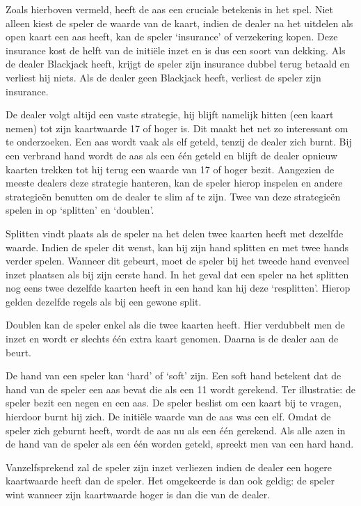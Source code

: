 \documentclass[11pt, final, journal, a4paper]{IEEEtran}
\begin{document}
Zoals hierboven vermeld, heeft de aas een cruciale betekenis in het spel. Niet alleen kiest de speler de waarde van de kaart, indien de dealer na het uitdelen als open kaart een aas heeft, kan de speler `insurance' of verzekering kopen. Deze insurance kost de helft van de initiële inzet en is dus een soort van dekking. Als de dealer Blackjack heeft, krijgt de speler zijn insurance dubbel terug betaald en verliest hij niets. Als de dealer geen Blackjack heeft, verliest de speler zijn insurance.

De dealer volgt altijd een vaste strategie, hij blijft namelijk hitten (een kaart nemen) tot zijn kaartwaarde 17 of hoger is. Dit maakt het net zo interessant om te onderzoeken. Een aas wordt vaak als elf geteld, tenzij de dealer zich burnt. Bij een verbrand hand wordt de aas als een één geteld en blijft de dealer opnieuw kaarten trekken tot hij terug een waarde van 17 of hoger bezit. Aangezien de meeste dealers deze strategie hanteren, kan de speler hierop inspelen en andere strategieën benutten om de dealer te slim af te zijn. Twee van deze strategieën spelen in op `splitten' en `doublen'. 

Splitten vindt plaats als de speler na het delen twee kaarten heeft met dezelfde waarde. Indien de speler dit wenst, kan hij zijn hand splitten en met twee hands verder spelen. Wanneer dit gebeurt, moet de speler bij het tweede hand evenveel inzet plaatsen als bij zijn eerste hand. In het geval dat een speler na het splitten nog eens twee dezelfde kaarten heeft in een hand kan hij deze `resplitten'. Hierop gelden dezelfde regels als bij een gewone split.

Doublen kan de speler enkel als die twee kaarten heeft. Hier verdubbelt men de inzet en wordt er slechts één extra kaart genomen. Daarna is de dealer aan de beurt.

De hand van een speler kan `hard' of `soft' zijn. Een soft hand betekent dat de hand van de speler een aas bevat die als een 11 wordt gerekend. Ter illustratie: de speler bezit een negen en een aas. De speler beslist om een kaart bij te vragen, hierdoor burnt hij zich. De initiële waarde van de aas was een elf. Omdat de speler zich geburnt heeft, wordt de aas nu als een één gerekend. Als alle azen in de hand van de speler als een één worden geteld, spreekt men van een hard hand.

Vanzelfsprekend zal de speler zijn inzet verliezen indien de dealer een hogere kaartwaarde heeft dan de speler. Het omgekeerde is dan ook geldig: de speler wint wanneer zijn kaartwaarde hoger is dan die van de dealer.
\end{document}
